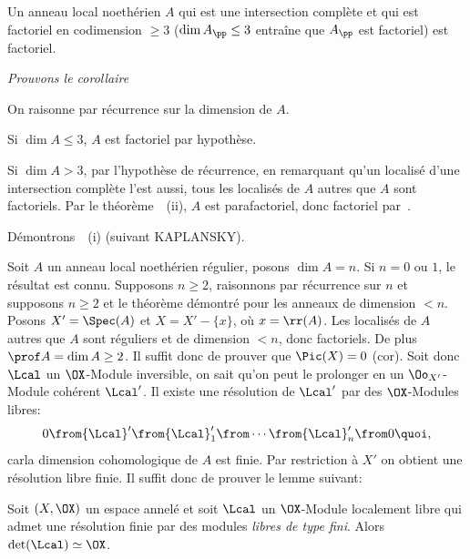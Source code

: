 \begin{corollaire} Un anneau local noeth\'erien $A$ qui est une intersection compl\`ete et qui est factoriel en codimension $\geq 3$ (\ie $\dim A_{{\pp}}\leq 3$ entra\^ine que $A_{{\pp}}$ est factoriel) est factoriel.
\end{corollaire}

\emph{Prouvons le corollaire}

On raisonne par r\'ecurrence sur la dimension de $A$.

Si $\dim A\leq 3$, $A$ est factoriel par hypoth\`ese.

Si $\dim A>3$, par l'hypoth\`ese de r\'ecurrence, en remarquant qu'un localis\'e d'une intersection compl\`ete l'est aussi, tous les localis\'es de $A$ autres que $A$ sont factoriels. Par le th\'eor\`eme~~(ii), $A$ est parafactoriel, donc factoriel par~.

D\'emontrons~~(i) (suivant KAPLANSKY).

Soit $A$ un anneau local noeth\'erien r\'egulier, posons $\dim A=n$. Si $n=0$ ou $1$, le r\'esultat est connu. Supposons $n\geq 2$, raisonnons par r\'ecurrence sur $n$ et supposons $n\geq 2$ et le th\'eor\`eme d\'emontr\'e pour les anneaux de dimension $<n$. Posons $X'=\Spec(A)$ et $X=X'-\{x\}$, o\`u $x=\rr(A)$. Les localis\'es de $A$ autres que $A$ sont r\'eguliers et de dimension $<n$, donc factoriels. De plus $\prof A = \dim A\geq 2$. Il suffit donc de prouver que $\Pic(X)=0$ (cor\ptbl{}). Soit donc ${\Lcal}$ un $\OX$-Module inversible, on sait qu'on peut le prolonger en un $\Oo_{X'}$-Module coh\'erent ${\Lcal}'$. Il existe une r\'esolution de ${\Lcal}'$ par des $\OX$-Modules libres:
\[
0\from {\Lcal}'\from {\Lcal}'_1\from\cdots\from{\Lcal}'_n\from 0{\quoi},
\]
car\pageoriginale la dimension cohomologique de $A$ est finie. Par restriction \`a $X'$ on obtient une r\'esolution libre finie. Il suffit donc de prouver le lemme suivant:

\begin{lemme} \label{XI.3.15} Soit $(X, \OX)$ un espace annel\'e et soit ${\Lcal}$ un $\OX$-Module localement libre qui admet une r\'esolution finie par des modules \emph{libres de type fini}. Alors $\det({\Lcal}) \simeq \OX$.
\end{lemme}

